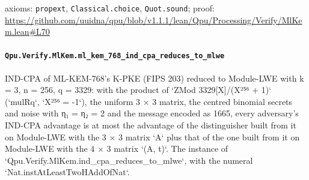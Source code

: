 \documentclass[11pt]{article}
\begin{document}
\noindent axioms: \texttt{propext}, \texttt{Classical.choice}, \texttt{Quot.sound}; proof: \url{https://github.com/uuidna/qpu/blob/v1.1.1/lean/Qpu/Processing/Verify/MlKem.lean\#L70}

\paragraph{\texttt{Qpu.Verify.MlKem.ml\_kem\_768\_ind\_cpa\_reduces\_to\_mlwe}}
IND-CPA of ML-KEM-768's K-PKE (FIPS 203) reduced to Module-LWE with k = 3, n = 256, q = 3329: with the product of `ZMod 3329[X]/(X²⁵⁶ + 1)` (`mulRq`, `X²⁵⁶ = -1`), the uniform 3 × 3 matrix, the centred binomial secrets and noise with η₁ = η₂ = 2 and the message encoded as 1665, every adversary's IND-CPA advantage is at most the advantage of the distinguisher built from it on Module-LWE with the 3 × 3 matrix `A` plus that of the one built from it on Module-LWE with the 4 × 3 matrix `(A, t)`. The instance of `Qpu.Verify.MlKem.ind\_cpa\_reduces\_to\_mlwe`, with the numeral `Nat.instAtLeastTwoHAddOfNat`.
\end{document}
